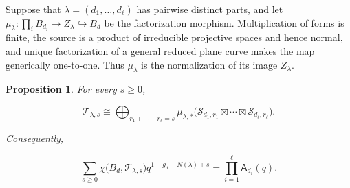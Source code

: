 \documentclass[11pt,reqno]{amsart}
\newtheorem{proposition}[theorem]{Proposition}
\theoremstyle{definition}
\begin{document}
Suppose that $\lambda=(d_1,\ldots,d_\ell)$ has pairwise distinct parts, and
let $\mu_\lambda:\prod_iB_{d_i}\to Z_\lambda\hookrightarrow B_d$ be the
factorization morphism.  Multiplication of forms is finite, the source is a
product of irreducible projective spaces and hence normal, and unique
factorization of a general reduced plane curve makes the map generically
one-to-one.  Thus $\mu_\lambda$ is the normalization of its image
$Z_\lambda$.

\begin{proposition}\label{prop:distinct-product}
For every $s\ge0$,

\begin{equation}\label{eq:boundary-complex-product}
  \mathcal T_{\lambda,s}
  \cong
  \bigoplus_{r_1+\cdots+r_\ell=s}
  \mu_{\lambda,*}
  \bigl(
    \mathcal S_{d_1,r_1}\boxtimes\cdots\boxtimes
    \mathcal S_{d_\ell,r_\ell}
  \bigr).
\end{equation}

Consequently,

\begin{equation}\label{eq:kkv-reducible-product}
  \sum_{s\ge0}
  \chi\bigl(B_d,\mathcal T_{\lambda,s}\bigr)
  q^{1-g_d+N(\lambda)+s}
  =\prod_{i=1}^{\ell}\mathsf A_{d_i}(q).
\end{equation}
\end{proposition}
\end{document}
